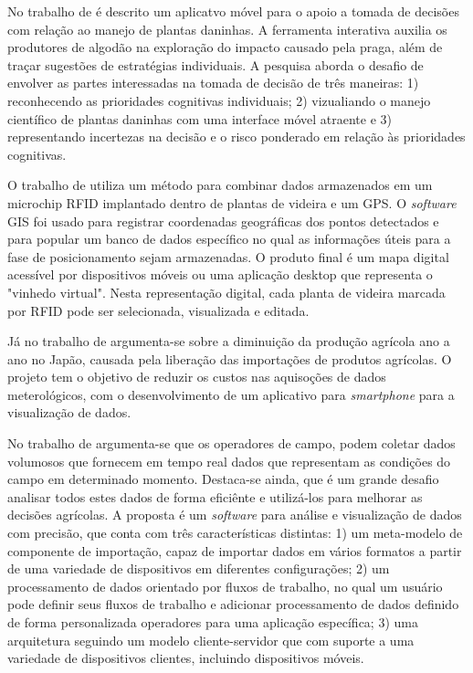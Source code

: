 \documentclass[12pt]{article}
\begin{document}
No trabalho de  é descrito um aplicatvo móvel para o apoio a tomada de decisões com relação ao manejo de plantas daninhas. A ferramenta interativa auxilia os produtores de algodão na exploração do impacto causado pela praga, além de traçar sugestões de estratégias individuais. A pesquisa aborda o desafio de envolver as partes interessadas na tomada de decisão de três maneiras: 1) reconhecendo as prioridades cognitivas individuais; 2) vizualiando o manejo científico de plantas daninhas com uma interface móvel atraente e 3) representando incertezas na decisão e o risco ponderado em relação às prioridades cognitivas.

O trabalho de  utiliza um método para combinar dados armazenados em um microchip RFID implantado dentro de plantas de videira e um GPS. O \textit{software} GIS foi usado para registrar coordenadas geográficas dos pontos detectados e para popular um banco de dados específico no qual as informações úteis para a fase de posicionamento sejam armazenadas. O produto final é um mapa digital acessível por dispositivos móveis ou uma aplicação desktop que representa o "vinhedo virtual". Nesta representação digital, cada planta de videira marcada por RFID pode ser selecionada, visualizada e editada.

Já no trabalho de  argumenta-se sobre a diminuição da produção agrícola ano a ano no Japão, causada pela liberação das importações de produtos agrícolas. O projeto tem o objetivo de reduzir os custos nas aquisoções de dados meterológicos, com o desenvolvimento de um aplicativo para \textit{smartphone} para a visualização de dados.

No trabalho de  argumenta-se que os operadores de campo, podem coletar dados volumosos que fornecem em tempo real dados que representam as condições do campo em determinado momento. Destaca-se ainda, que é um grande desafio analisar todos estes dados de forma eficiênte e utilizá-los para melhorar as decisões agrícolas. A proposta é um \textit{software} para análise e visualização de dados com precisão, que conta com três características distintas: 1) um meta-modelo de componente de importação, capaz de importar dados em vários formatos a partir de uma variedade de dispositivos em diferentes configurações; 2) um processamento de dados orientado por fluxos de trabalho, no qual um usuário pode definir seus fluxos de trabalho e adicionar processamento de dados definido de forma personalizada operadores para uma aplicação específica; 3) uma arquitetura seguindo um modelo cliente-servidor que com suporte a uma variedade de dispositivos clientes, incluindo dispositivos móveis.
\end{document}
